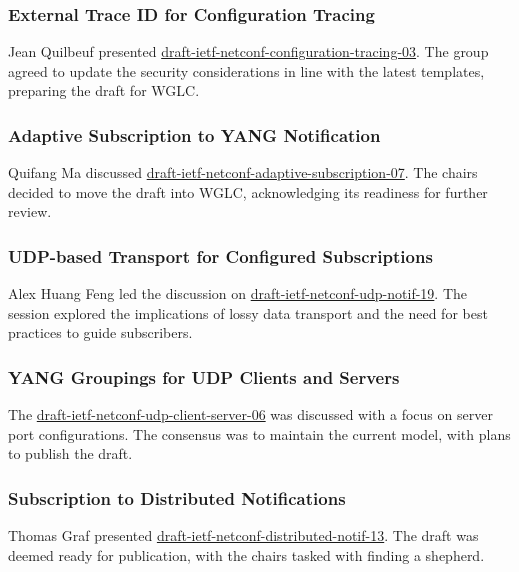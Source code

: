\documentclass{article}
\begin{document}
\subsubsection{External Trace ID for Configuration Tracing}
Jean Quilbeuf presented \href{https://datatracker.ietf.org/doc/html/draft-ietf-netconf-configuration-tracing-03}{draft-ietf-netconf-configuration-tracing-03}. The group agreed to update the security considerations in line with the latest templates, preparing the draft for WGLC.

\subsubsection{Adaptive Subscription to YANG Notification}
Quifang Ma discussed \href{https://datatracker.ietf.org/doc/html/draft-ietf-netconf-adaptive-subscription-07}{draft-ietf-netconf-adaptive-subscription-07}. The chairs decided to move the draft into WGLC, acknowledging its readiness for further review.

\subsubsection{UDP-based Transport for Configured Subscriptions}
Alex Huang Feng led the discussion on \href{https://datatracker.ietf.org/doc/html/draft-ietf-netconf-udp-notif-19}{draft-ietf-netconf-udp-notif-19}. The session explored the implications of lossy data transport and the need for best practices to guide subscribers.

\subsubsection{YANG Groupings for UDP Clients and Servers}
The \href{https://datatracker.ietf.org/doc/html/draft-ietf-netconf-udp-client-server-06}{draft-ietf-netconf-udp-client-server-06} was discussed with a focus on server port configurations. The consensus was to maintain the current model, with plans to publish the draft.

\subsubsection{Subscription to Distributed Notifications}
Thomas Graf presented \href{https://datatracker.ietf.org/doc/html/draft-ietf-netconf-distributed-notif-13}{draft-ietf-netconf-distributed-notif-13}. The draft was deemed ready for publication, with the chairs tasked with finding a shepherd.
\end{document}
